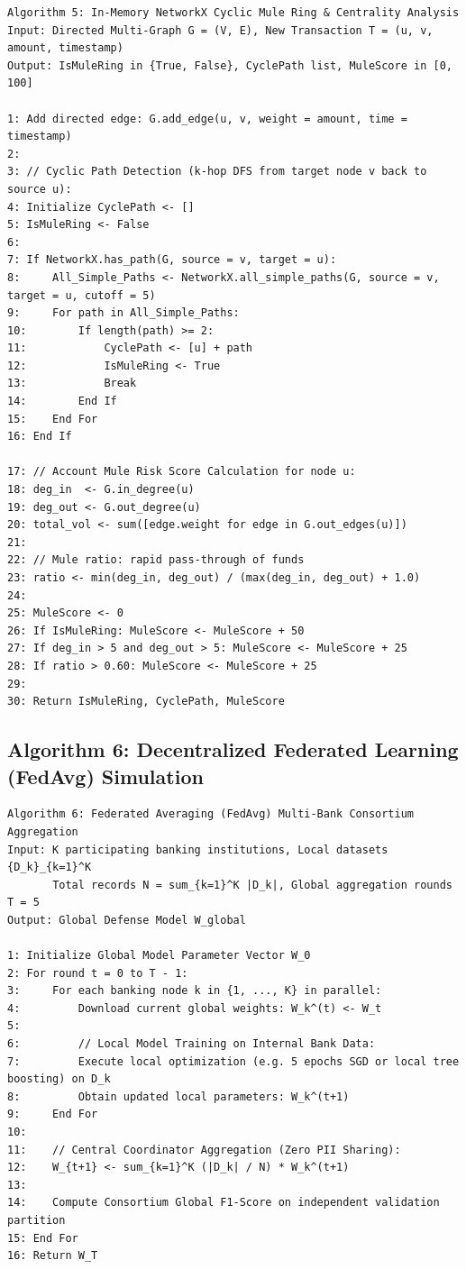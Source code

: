 \documentclass[12pt,a4paper,oneside]{report}
\begin{document}
\begin{lstlisting}
Algorithm 5: In-Memory NetworkX Cyclic Mule Ring & Centrality Analysis
Input: Directed Multi-Graph G = (V, E), New Transaction T = (u, v, amount, timestamp)
Output: IsMuleRing in {True, False}, CyclePath list, MuleScore in [0, 100]

1: Add directed edge: G.add_edge(u, v, weight = amount, time = timestamp)
2: 
3: // Cyclic Path Detection (k-hop DFS from target node v back to source u):
4: Initialize CyclePath <- []
5: IsMuleRing <- False
6: 
7: If NetworkX.has_path(G, source = v, target = u):
8:     All_Simple_Paths <- NetworkX.all_simple_paths(G, source = v, target = u, cutoff = 5)
9:     For path in All_Simple_Paths:
10:        If length(path) >= 2:
11:            CyclePath <- [u] + path
12:            IsMuleRing <- True
13:            Break
14:        End If
15:    End For
16: End If

17: // Account Mule Risk Score Calculation for node u:
18: deg_in  <- G.in_degree(u)
19: deg_out <- G.out_degree(u)
20: total_vol <- sum([edge.weight for edge in G.out_edges(u)])
21: 
22: // Mule ratio: rapid pass-through of funds
23: ratio <- min(deg_in, deg_out) / (max(deg_in, deg_out) + 1.0)
24: 
25: MuleScore <- 0
26: If IsMuleRing: MuleScore <- MuleScore + 50
27: If deg_in > 5 and deg_out > 5: MuleScore <- MuleScore + 25
28: If ratio > 0.60: MuleScore <- MuleScore + 25
29: 
30: Return IsMuleRing, CyclePath, MuleScore
\end{lstlisting}


\subsection{Algorithm 6: Decentralized Federated Learning (FedAvg) Simulation}

\begin{lstlisting}
Algorithm 6: Federated Averaging (FedAvg) Multi-Bank Consortium Aggregation
Input: K participating banking institutions, Local datasets {D_k}_{k=1}^K
       Total records N = sum_{k=1}^K |D_k|, Global aggregation rounds T = 5
Output: Global Defense Model W_global

1: Initialize Global Model Parameter Vector W_0
2: For round t = 0 to T - 1:
3:     For each banking node k in {1, ..., K} in parallel:
4:         Download current global weights: W_k^(t) <- W_t
5:         
6:         // Local Model Training on Internal Bank Data:
7:         Execute local optimization (e.g. 5 epochs SGD or local tree boosting) on D_k
8:         Obtain updated local parameters: W_k^(t+1)
9:     End For
10:    
11:    // Central Coordinator Aggregation (Zero PII Sharing):
12:    W_{t+1} <- sum_{k=1}^K (|D_k| / N) * W_k^(t+1)
13:    
14:    Compute Consortium Global F1-Score on independent validation partition
15: End For
16: Return W_T
\end{lstlisting}
\end{document}
